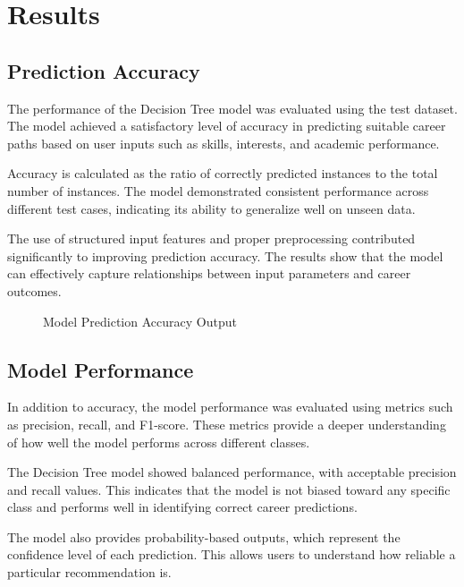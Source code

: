 \documentclass[12pt,a4paper]{report}
\begin{document}
{\chapter{Results}
\setlength{\parindent}{0pt}
\setlength{\parskip}{0.6em}
\justifying

\section{Prediction Accuracy}

The performance of the Decision Tree model was evaluated using the test dataset. The model achieved a satisfactory level of accuracy in predicting suitable career paths based on user inputs such as skills, interests, and academic performance.

Accuracy is calculated as the ratio of correctly predicted instances to the total number of instances. The model demonstrated consistent performance across different test cases, indicating its ability to generalize well on unseen data.

The use of structured input features and proper preprocessing contributed significantly to improving prediction accuracy. The results show that the model can effectively capture relationships between input parameters and career outcomes.

\begin{figure}[h]
\centering
{}
\caption{Model Prediction Accuracy Output}
\end{figure}

\section{Model Performance}

In addition to accuracy, the model performance was evaluated using metrics such as precision, recall, and F1-score. These metrics provide a deeper understanding of how well the model performs across different classes.

The Decision Tree model showed balanced performance, with acceptable precision and recall values. This indicates that the model is not biased toward any specific class and performs well in identifying correct career predictions.

The model also provides probability-based outputs, which represent the confidence level of each prediction. This allows users to understand how reliable a particular recommendation is.

}
\end{document}
